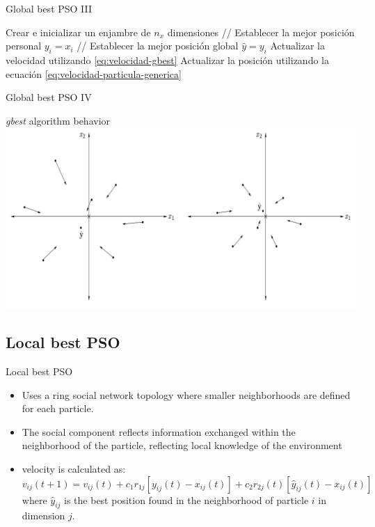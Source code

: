 \documentclass[aspectratio=169,compress,10pt]{beamer}
\begin{document}
\begin{frame}{Global best PSO III}
\begin{algorithm}[H]
\scriptsize
\begin{algorithmic}[1] 
\STATE Crear e inicializar un enjambre de $n_x$ dimensiones
\REPEAT
		\STATE // Establecer la mejor posición personal
			\STATE $y_i = x_i$
		\ENDIF
		\STATE // Establecer la mejor posición global 
			\STATE $\hat{y} = y_i$
		\ENDIF
	\ENDFOR
		\STATE Actualizar la velocidad utilizando \ref{eq:velocidad-gbest}
		\STATE Actualizar la posición utilizando la ecuación \ref{eq:velocidad-particula-generica}
	\ENDFOR
{}
\end{algorithmic} 
\caption{PSO gbest} 
\label{alg:algoritmo-pso-gbest}
\end{algorithm}
\end{frame}

\begin{frame}{Global best PSO IV}
\begin{block}{\emph{gbest} algorithm behavior}
\centering
\includegraphics[scale=0.25]{../resources/gbest-behavior}
\end{block}
\end{frame}

\subsection{Local best PSO}
\begin{frame}{Local best PSO}
\begin{itemize}
	\item Uses a ring social network topology where smaller neighborhoods are defined for each particle.
	\item The social component reflects information exchanged within the neighborhood of the particle, reflecting local knowledge of the environment
	\item velocity is calculated as:
\begin{equation}
	v_{ij}(t+1)=v_{ij}(t) + c_1 r_{1j}[y_{ij}(t) - x_{ij}(t)] + c_2 r_{2j}(t) [\hat{y}_{ij}(t) - x_{ij}(t)]
	\label{eq:velocidad-lbest}
\end{equation}
where $\hat{y}_{ij}$ is the best position found in the neighborhood of particle $i$ in dimension $j$.
\end{itemize}
\end{frame}
\end{document}
